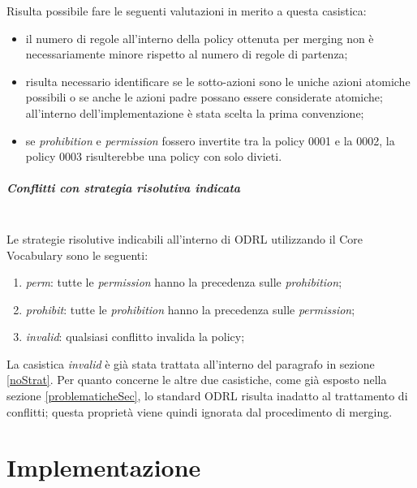 \documentclass[12pt,a4paper,twoside]{book}
\begin{document}
Risulta possibile fare le seguenti valutazioni in merito a questa casistica:
\begin{itemize}
	\item il numero di regole all'interno della policy ottenuta per merging non è necessariamente minore rispetto al numero di regole di partenza;
	\item risulta necessario identificare se le sotto-azioni sono le uniche azioni atomiche possibili o se anche le azioni padre possano essere considerate atomiche; all'interno dell'implementazione è stata scelta la prima convenzione;
	\item se \textit{prohibition} e \textit{permission} fossero invertite tra la policy 0001 e la 0002, la policy 0003 risulterebbe una policy con solo divieti.
\end{itemize}
\paragraph{Conflitti con strategia risolutiva indicata}\mbox{}\\
Le strategie risolutive indicabili all'interno di ODRL utilizzando il Core Vocabulary sono le seguenti:
\begin{enumerate}
	\item \textit{perm}: tutte le \textit{permission} hanno la precedenza sulle \textit{prohibition};
	\item \textit{prohibit}: tutte le \textit{prohibition} hanno la precedenza sulle \textit{permission};
	\item \textit{invalid}: qualsiasi conflitto invalida la policy;
\end{enumerate}
La casistica \textit{invalid} è già stata trattata all'interno del paragrafo in sezione \ref{noStrat}. Per quanto concerne le altre due casistiche, come già esposto nella sezione \ref{problematicheSec}, lo standard ODRL risulta inadatto al trattamento di conflitti; questa proprietà viene quindi ignorata dal procedimento di merging.

\chapter{Implementazione}\label{implementazioniCh}
\end{document}
